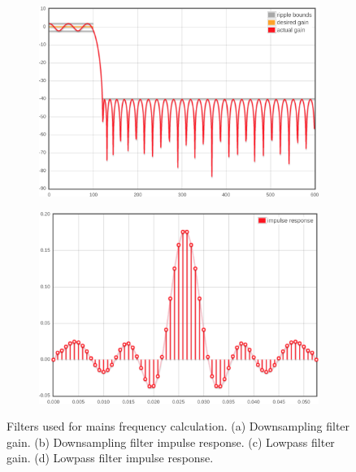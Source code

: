 \begin{figure}[h]
	\begin{subfigure}{.5\textwidth}
	  \centering
	  \includegraphics[width=0.9\linewidth]{img/filter2_gain.png}
	  \caption{}
	  \label{fig4:sub3}
	\end{subfigure}%
	\begin{subfigure}{.5\textwidth}
	  \centering
	  \includegraphics[width=0.9\linewidth]{img/filter2_response.png}
	  \caption{}
	  \label{fig4:sub4}
	\end{subfigure}
	\caption{Filters used for mains frequency calculation. (a) Downsampling filter gain. (b) Downsampling filter impulse response. (c) Lowpass filter gain. (d) Lowpass filter impulse response.}
	\label{fig:4}
\end{figure}

